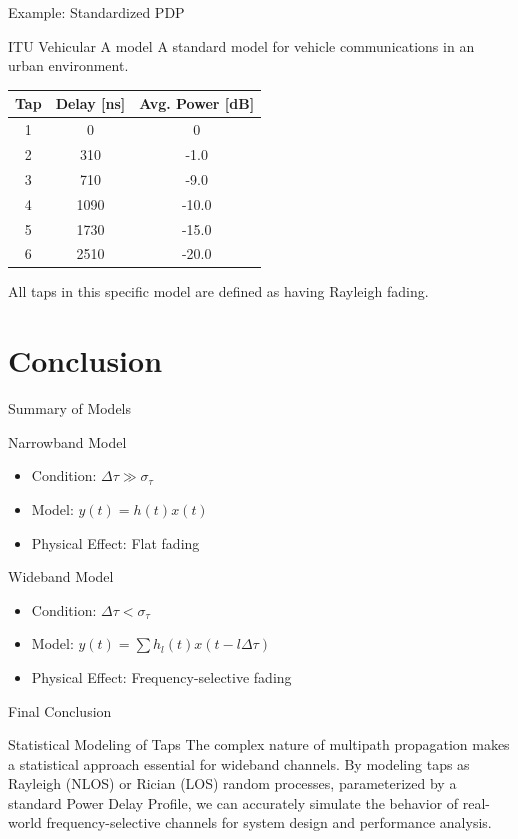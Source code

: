 \documentclass{beamer}
\begin{document}
	\begin{frame}{Example: Standardized PDP}
		\begin{block}{ITU Vehicular A model}
			A standard model for vehicle communications in an urban environment.
			\begin{center}
				\begin{tabular}{ccc}
					\toprule
					Tap & Delay [ns] & Avg. Power [dB] \\
					\midrule
					1 & 0 & 0 \\
					2 & 310 & -1.0 \\
					3 & 710 & -9.0 \\
					4 & 1090 & -10.0 \\
					5 & 1730 & -15.0 \\
					6 & 2510 & -20.0 \\
					\bottomrule
				\end{tabular}
			\end{center}
			All taps in this specific model are defined as having Rayleigh fading.
		\end{block}
	\end{frame}
	
	\section{Conclusion}
	
	\begin{frame}{Summary of Models}
		\begin{block}{Narrowband Model}
			\begin{itemize}
				\item Condition: $\Delta\tau \gg \sigma_\tau$
				\item Model: $y(t) = h(t)x(t)$
				\item Physical Effect: Flat fading
			\end{itemize}
		\end{block}
		
		\begin{block}{Wideband Model}
			\begin{itemize}
				\item Condition: $\Delta\tau < \sigma_\tau$
				\item Model: $y(t) = \sum h_l(t)x(t-l\Delta\tau)$
				\item Physical Effect: Frequency-selective fading
			\end{itemize}
		\end{block}
	\end{frame}
	
	\begin{frame}{Final Conclusion}
		\begin{alertblock}{Statistical Modeling of Taps}
			The complex nature of multipath propagation makes a statistical approach essential for wideband channels. By modeling taps as Rayleigh (NLOS) or Rician (LOS) random processes, parameterized by a standard Power Delay Profile, we can accurately simulate the behavior of real-world frequency-selective channels for system design and performance analysis.
		\end{alertblock}
	\end{frame}
	
\end{document}
